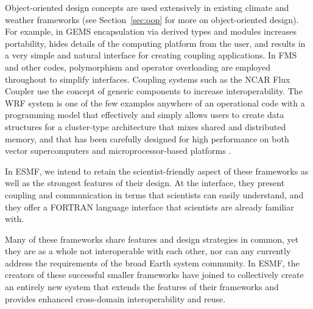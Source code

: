 Object-oriented design concepts are used extensively in existing climate and
weather frameworks (see Section~\ref{sec:oop} for more on object-oriented design). 
For example, in GEMS encapsulation 
via derived types and modules increases portability, hides details of the 
computing platform from the user, and results in a very simple and natural
interface for creating coupling applications.  
In FMS and other codes, polymorphism and operator overloading are 
employed throughout to simplify interfaces.  Coupling systems such 
as the NCAR Flux Coupler use the concept of generic components to
increase interoperability.  The WRF system is one of the few 
examples anywhere of an operational code with a programming model 
that effectively and simply allows users to create data structures 
for a cluster-type architecture that mixes shared and distributed memory, 
and that has been carefully designed for high performance on both vector 
supercomputers and microprocessor-based platforms \cite{wrfperfport}.

In ESMF, we intend to retain the scientist-friendly 
aspect of these frameworks as well as the strongest features of their design.  
At the interface, they present coupling and
communication in terms that scientists can easily understand, and they 
offer a FORTRAN language interface that scientists are already familiar 
with.  

Many of these frameworks share features and design strategies in common, yet 
they are as a whole not
interoperable with each other, nor can any currently address the requirements
of the broad Earth system community.  In ESMF, the creators of 
these successful smaller frameworks have joined to collectively create an
entirely new system that extends the features of their frameworks and provides 
enhanced cross-domain interoperability and reuse.








